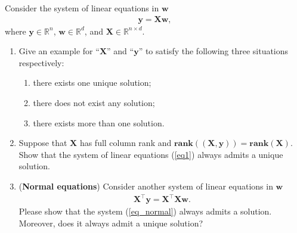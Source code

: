 \documentclass[11pt,letter,notitlepage]{article}
\newcommand{\rank}[1]{ \textbf{rank}  (#1)  }
\theoremstyle{definition}
\begin{document}
	\begin{solution}
		
	\end{solution}
	
	\newpage
	
	\begin{exercise}
		
		Consider the system of linear equations in $\mathbf{w}$
		\begin{align}\label{eq1}
			\mathbf{y} = \mathbf{X} \mathbf{w} ,    
		\end{align}
		where $\mathbf{y} \in \mathbb{R}^{n}$, $\mathbf{w} \in \mathbb{R}^{d}$, and $\mathbf{X} \in \mathbb{R}^{n \times d}$.
		
		\begin{enumerate}
			\item Give an example for ``$\mathbf{X}$'' and ``$\mathbf{y}$'' to satisfy the following three situations respectively:
			\begin{enumerate}
				\item there exists one unique solution;
				\item there does not exist any solution;
				\item there exists more than one solution.
			\end{enumerate}
			\item Suppose that $\mathbf{X}$ has full column rank and $\rank{(\mathbf{X}, \mathbf{y})} = \rank{\mathbf{X}}$. Show that the system of linear equations (\ref{eq1}) always admits a unique solution.
			
			\item (\textbf{Normal equations}) Consider  another system of linear equations in $\mathbf{w}$
			\begin{align}\label{eq_normal}
				\mathbf{X}^{\top}\mathbf{y} = \mathbf{X}^{\top}\mathbf{X}\mathbf{w}. 
			\end{align}
			Please show that the system (\ref{eq_normal}) always admits a solution. Moreover, does it always admit a unique solution?
		\end{enumerate}
		
	\end{exercise}
	
	\begin{solution}
		
	\end{solution}
	
	\newpage
	
\end{document}
